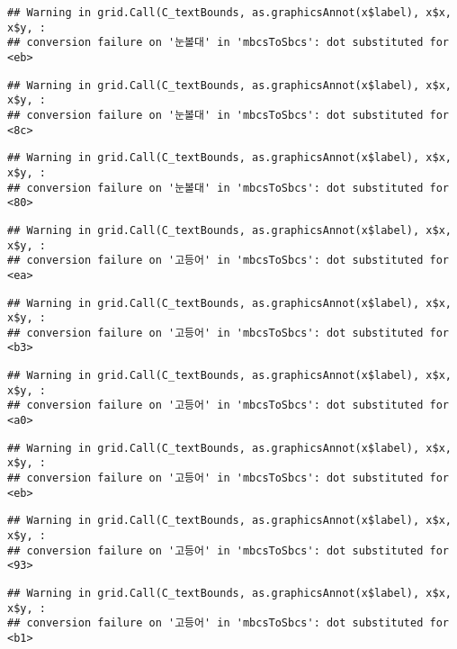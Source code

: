 \documentclass[
]{article}
\begin{document}
\begin{verbatim}
## Warning in grid.Call(C_textBounds, as.graphicsAnnot(x$label), x$x, x$y, :
## conversion failure on '눈볼대' in 'mbcsToSbcs': dot substituted for <eb>
\end{verbatim}

\begin{verbatim}
## Warning in grid.Call(C_textBounds, as.graphicsAnnot(x$label), x$x, x$y, :
## conversion failure on '눈볼대' in 'mbcsToSbcs': dot substituted for <8c>
\end{verbatim}

\begin{verbatim}
## Warning in grid.Call(C_textBounds, as.graphicsAnnot(x$label), x$x, x$y, :
## conversion failure on '눈볼대' in 'mbcsToSbcs': dot substituted for <80>
\end{verbatim}

\begin{verbatim}
## Warning in grid.Call(C_textBounds, as.graphicsAnnot(x$label), x$x, x$y, :
## conversion failure on '고등어' in 'mbcsToSbcs': dot substituted for <ea>
\end{verbatim}

\begin{verbatim}
## Warning in grid.Call(C_textBounds, as.graphicsAnnot(x$label), x$x, x$y, :
## conversion failure on '고등어' in 'mbcsToSbcs': dot substituted for <b3>
\end{verbatim}

\begin{verbatim}
## Warning in grid.Call(C_textBounds, as.graphicsAnnot(x$label), x$x, x$y, :
## conversion failure on '고등어' in 'mbcsToSbcs': dot substituted for <a0>
\end{verbatim}

\begin{verbatim}
## Warning in grid.Call(C_textBounds, as.graphicsAnnot(x$label), x$x, x$y, :
## conversion failure on '고등어' in 'mbcsToSbcs': dot substituted for <eb>
\end{verbatim}

\begin{verbatim}
## Warning in grid.Call(C_textBounds, as.graphicsAnnot(x$label), x$x, x$y, :
## conversion failure on '고등어' in 'mbcsToSbcs': dot substituted for <93>
\end{verbatim}

\begin{verbatim}
## Warning in grid.Call(C_textBounds, as.graphicsAnnot(x$label), x$x, x$y, :
## conversion failure on '고등어' in 'mbcsToSbcs': dot substituted for <b1>
\end{verbatim}
\end{document}
